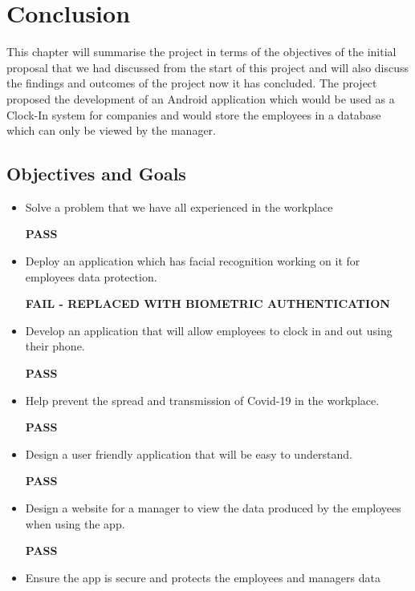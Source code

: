\chapter{Conclusion}
This chapter will summarise the project in terms of the objectives of the initial proposal that we had discussed from the start of this project
and will also discuss the findings and outcomes of the project now it has concluded.
The project proposed the development of an Android application which would be used as a Clock-In system for companies and would store the employees in a database which can only be viewed by the manager.

\section{Objectives and Goals}
\begin{itemize}
  \item Solve a problem that we have all experienced in the workplace
   \begin{center}
      \textbf{PASS}
  \end{center}
  \item Deploy an application which has facial recognition working on it for employees data protection.
   \begin{center}
      \textbf{FAIL - REPLACED WITH BIOMETRIC AUTHENTICATION}
  \end{center}
  \item Develop an application that will allow employees to clock in and out using their phone.
  \begin{center}
      \textbf{PASS}
  \end{center}
  \item Help prevent the spread and transmission of Covid-19 in the workplace.
  \begin{center}
      \textbf{PASS}
  \end{center}
  \item Design a user friendly application that will be easy to understand.
  \begin{center}
      \textbf{PASS}
  \end{center}
  \item Design a website for a manager to view the data produced by the employees when using the app.
  \begin{center}
      \textbf{PASS}
  \end{center}
  \item Ensure the app is secure and protects the employees and managers data

\end{itemize}
